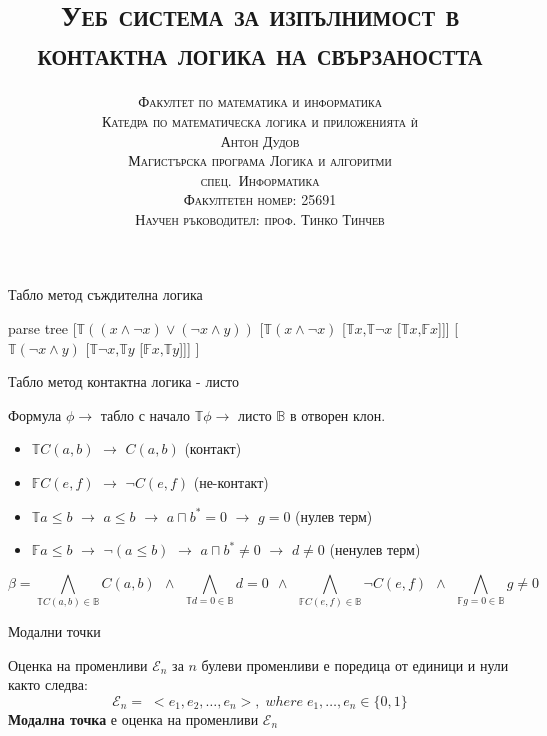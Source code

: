 \documentclass[14pt, aspectratio=169]{beamer}
\date[\today]{}
\title{\textsc{Уеб система за изпълнимост в контактна логика на свързаността}}
\author[Антон Дудов]{
	\textsc{Факултет по математика и информатика} \\
	\textsc{Катедра по математическа логика и приложенията ѝ} \\ [3mm]
	\textsc{Антон Дудов} \\ [3mm]
	\small
	\textsc{Магистърска програма Логика и алгоритми} \\
	\textsc{спец.~Информатика} \\
	\textsc{Факултетен номер: 25691} \\ [3mm]
	\small\textsc{Научен ръководител: проф. Тинко Тинчев}
}
\newcommand\ST{\mathbb{T}}
\newcommand\SF{\mathbb{F}}
\newcommand\SB{\mathbb{B}}
\newcommand\E{\mathcal{E}}
\newcommand{\BranchConjunction}{%
\begin{equation*}
			\beta =
			\bigwedge_{\ST C(a,b)\in{\SB}} C(a, b) \:\: \wedge \:\:
			\bigwedge_{\ST d = 0\in{\SB}} d = 0 \:\: \wedge \:\:
			\bigwedge_{\SF C(e,f)\in{\SB}} \neg C(e, f) \:\: \wedge \:\:
			\bigwedge_{\SF g = 0\in{\SB}} g \neq 0
\end{equation*}%
}
\begin{document}
\begin{frame}
\titlepage
\end{frame}


\begin{frame}{Табло метод съждителна логика}
	\begin{center}
	\begin{forest}
		parse tree
		[$\ST ((x \land \neg x) \lor (\neg x \land y))$
			[$\ST (x \land \neg x)$ [$\ST x \mbox{,} \ST \neg x$ [$\ST x \mbox{,} \SF x$]]]
			[$\ST (\neg x \land y)$ [$\ST \neg  x \mbox{,} \ST y$ [$\SF x \mbox{,} \ST y$]]]
		]
	\end{forest}
	\end{center}
\end{frame}

\begin{frame}{Табло метод контактна логика - листо}
	\begin{center}
		Формула $\phi \rightarrow$ табло с начало $\ST \phi \rightarrow$ листо $\SB$ в отворен клон.
	\end{center}

	\begin{itemize}
		\item $\ST C(a,b)$ $\rightarrow$ $C(a,b)$ (контакт)
		\item $\SF C(e,f)$ $\rightarrow$ $\neg C(e,f)$ (не-контакт)
		\item $\ST a \leq b$ $\rightarrow$ $a \leq b$ $\rightarrow$ $a \sqcap b^*=0$ $\rightarrow$ $g = 0$ (нулев терм)
		\item $\SF a \leq b$ $\rightarrow$ $\neg (a \leq b)$ $\rightarrow$ $a \sqcap b^* \neq 0$ $\rightarrow$ $d \neq 0$ (ненулев терм)
	\end{itemize}

	\BranchConjunction
\end{frame}


\begin{frame}{Модални точки}
	\begin{definition}
		Оценка на променливи $\E_n$ за $n$ булеви променливи е поредица от единици и нули както следва:
		\begin{equation*}
			\E_n = \; < e_1, e_2, \ldots , e_n >, \; where \; e_1, \ldots, e_n \in \{0, 1 \}
		\end{equation*}
		\textbf{Модална точка} е оценка на променливи $\E_n$
	\end{definition}
\end{frame}
\end{document}
